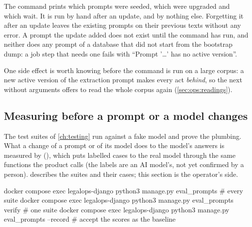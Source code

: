 The command prints which prompts were seeded, which were upgraded and which wait. It is run
by hand after an update, and by nothing else. Forgetting it after an
update leaves the existing prompts on their previous texts without any error. A prompt the
update added does not exist until the command has run, and neither does any prompt of a
database that did not start from the bootstrap dump: a job step that needs one fails with
\enquote{Prompt '…' has no active version}.

One side effect is worth knowing before the command is run on a large corpus: a new active
version of the extraction prompt makes every act \emph{behind}, so the next
 without arguments offers to read the whole corpus again
(\cref{sec:ops:readings}).

\subsection{Measuring before a prompt or a model changes}

The test suites of \cref{ch:testing} run against a fake model and prove the plumbing. What a
change of a prompt or of its model does to the model's answers is measured by
 (), which puts labelled
cases to the real model through the same functions the product calls (the labels are an AI
model's, not yet confirmed by a person). 
describes the suites and their cases; this section is the operator's side.

\begin{codeblock}
docker compose exec legalops-django python3 manage.py eval_prompts            # every suite
docker compose exec legalops-django python3 manage.py eval_prompts verify     # one suite
docker compose exec legalops-django python3 manage.py eval_prompts --record   # accept the scores as the baseline
\end{codeblock}

